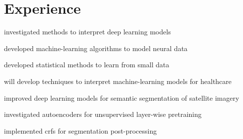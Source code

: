 \begin{minipage}[t]{0.66\textwidth} %


\section{Experience}

\vspace{\topsep} %
\begin{tightitemize}
\item investigated methods to interpret deep learning models
\item developed machine-learning algorithms to model neural data
\item developed statistical methods to learn from small data
\end{tightitemize}

\sectionspace %



\begin{tightitemize}
\item will develop techniques to interpret machine-learning models for healthcare
\end{tightitemize}
\sectionspace %


\begin{tightitemize}
\item improved deep learning models for semantic segmentation of satellite imagery
\item investigated autoencoders for unsupervised layer-wise pretraining
\item implemented crfs for segmentation post-processing
\end{tightitemize}
\sectionspace %



\end{minipage}
